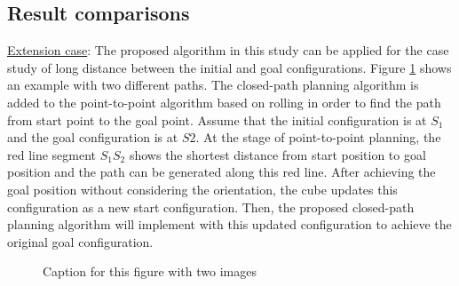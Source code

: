 \subsection{Result comparisons}
\noindent \uline{Extension case}: The proposed algorithm in this study can be applied for the case study of long distance between the initial and goal configurations. 
Figure \ref{fig:cubeLongDist} shows an example with two different paths.
The closed-path planning algorithm is added to the point-to-point algorithm based on rolling in order to find the path from start point to the goal point. 
Assume that the initial configuration is at $S_1$ and the goal configuration is at $S2$.
At the stage of point-to-point planning, the red line segment $S_1S_2$ shows the shortest distance from start position to goal position and the path can be generated along this red line. 
After achieving the goal position without considering the orientation, the cube updates this configuration as a new start configuration.
Then, the proposed closed-path planning algorithm will implement with this updated configuration to achieve the original goal configuration.
\\ 

\begin{figure}[H]
\caption{Caption for this figure with two images}
\label{fig:cubeLongDist}
\end{figure}

